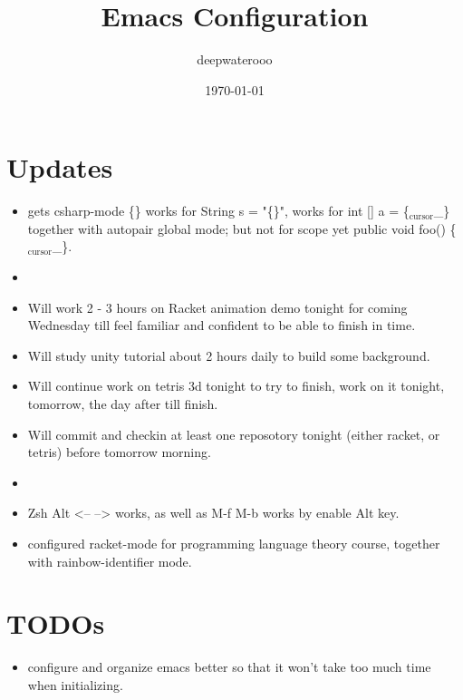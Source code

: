 \documentclass[9pt,b5paper]{article}
\author{deepwaterooo}
\date{\today}
\title{Emacs Configuration}
\begin{document}
\maketitle
\tableofcontents


\section{Updates}
\label{sec-1}
\begin{itemize}
\item gets csharp-mode \{\} works for String s = "\{\}", works for int [] a = \{$_{\text{cursor}}$\_\} together with autopair global mode; but not for scope yet public void foo() \{$_{\text{cursor}}$\_\}.
\item 
\item Will work 2 - 3 hours on Racket animation demo tonight for coming Wednesday till feel familiar and confident to be able to finish in time.
\item Will study unity tutorial about 2 hours daily to build some background.
\item Will continue work on tetris 3d tonight to try to finish, work on it tonight, tomorrow, the day after till finish.
\item Will commit and checkin at least one reposotory tonight (either racket, or tetris) before tomorrow morning.
\item 
\item Zsh Alt <-- --> works, as well as M-f M-b works by enable Alt key.
\item configured racket-mode for programming language theory course, together with rainbow-identifier mode.
\end{itemize}

\section{TODOs}
\label{sec-2}
\begin{itemize}
\item configure and organize emacs better so that it won't take too much time when initializing.
\end{itemize}
\end{document}
